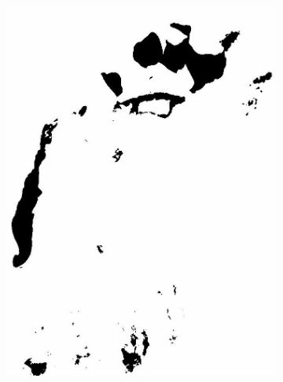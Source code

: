 \documentclass[12pt,a4paper]{article}
\begin{document}
\begin{figure}
\begin{subfigure}[b]{0.19\textwidth}
         \includegraphics[width=\textwidth]{../img/2021w.jpg}
         \caption{}
         \label{fig:}
     \end{subfigure}
\end{figure}

\printbibliography
\end{document}
